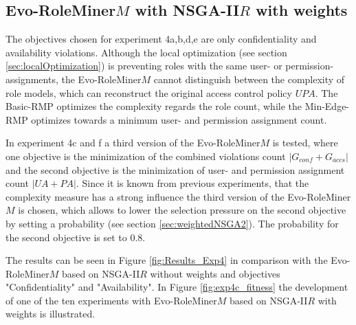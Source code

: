 \subsection{Evo-RoleMiner$M$ with NSGA-II$R$ with weights}
\label{sec:exp_nsga2rweights}
The objectives chosen for experiment 4a,b,d,e are only confidentiality and availability violations. Although the local optimization (see section \ref{sec:localOptimization}) is preventing roles with the same user- or permission-assignments, the Evo-RoleMiner$M$ cannot distinguish between the complexity of role models, which can reconstruct the original access control policy $UPA$. The Basic-RMP optimizes the complexity regards the role count, while the Min-Edge-RMP optimizes towards a minimum user- and permission assignment count.

In experiment 4c and f a third version of the Evo-RoleMiner$M$ is tested, where one objective is the minimization of the combined violations count $|G_{conf} + G_{accs}|$ and the second objective is the minimization of user- and permission assignment count $|UA + PA|$. Since it is known from previous experiments, that the complexity measure has a strong influence the third version of the Evo-RoleMiner$M$ is chosen, which allows to lower the selection pressure on the second objective by setting a probability (see section \ref{sec:weightedNSGA2}). The probability for the second objective is set to 0.8.

The results can be seen in Figure \ref{fig:Results_Exp4} in comparison with the Evo-RoleMiner$M$ based on NSGA-II$R$ without weights and objectives "Confidentiality" and "Availability". In Figure \ref{fig:exp4c_fitness} the development of one of the ten experiments with Evo-RoleMiner$M$ based on NSGA-II$R$ with weights is illustrated.

